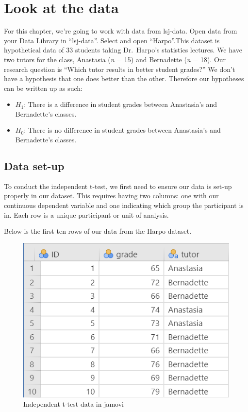 \documentclass[
]{book}
\providecommand{\tightlist}{%
  \setlength{\itemsep}{0pt}\setlength{\parskip}{0pt}}
\begin{document}
\hypertarget{look-at-the-data}{%
\section{Look at the data}\label{look-at-the-data}}

For this chapter, we're going to work with data from lsj-data. Open data from your Data Library in ``lsj-data''. Select and open ``Harpo''.This dataset is hypothetical data of 33 students taking Dr.~Harpo's statistics lectures. We have two tutors for the class, Anastasia (\emph{n} = 15) and Bernadette (\emph{n} = 18). Our research question is ``Which tutor results in better student grades?'' We don't have a hypothesis that one does better than the other. Therefore our hypotheses can be written up as such:

\begin{itemize}
\tightlist
\item
  \(H_1\): There is a difference in student grades between Anastasia's and Bernadette's classes.
\item
  \(H_0\): There is no difference in student grades between Anastasia's and Bernadette's classes.
\end{itemize}

\hypertarget{data-set-up}{%
\subsection{Data set-up}\label{data-set-up}}

To conduct the independent t-test, we first need to ensure our data is set-up properly in our dataset. This requires having two columns: one with our continuous dependent variable and one indicating which group the participant is in. Each row is a unique participant or unit of analysis.

Below is the first ten rows of our data from the Harpo dataset.

\begin{figure}

{\centering \includegraphics[width=0.8\linewidth]{images/02-independent_t-test/independent_t-test_data} 

}

\caption{Independent t-test data in jamovi}\label{fig:unnamed-chunk-1}
\end{figure}
\end{document}
